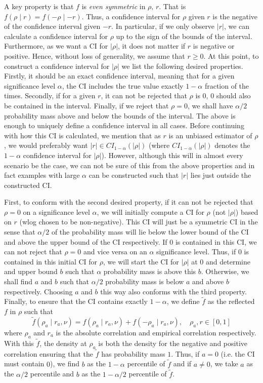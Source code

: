 \documentclass[../Thesis.tex]{subfiles}
\begin{document}
A key property is that $f$ is \textit{even symmetric} in $\rho,\, r$. That is $f(\rho \mid r) = f(-\rho \mid -r)$. Thus, a confidence interval for $\rho$ given $r$ is the negative of the confidence interval given $-r$. In particular, if we only observe $|r|$, we can calculate a confidence interval for $\rho$ up to the sign of the bounds of the interval. Furthermore, as we want a CI for $|\rho|$, it does not matter if $r$ is negative or positive. Hence, without loss of generality, we assume that $r \geq 0$. At this point, to construct a confidence interval for $|\rho|$ we list the following desired properties. Firstly, it should be an exact confidence interval, meaning that for a given significance level $\alpha$, the CI includes the true value exactly $1-\alpha$ fraction of the times. Secondly, if for a given $r$, it can not be rejected that $\rho$ is 0, 0 should also be contained in the interval. Finally, if we reject that $\rho = 0$, we shall have $\alpha/2$ probability mass above and below the bounds of the interval. The above is enough to uniquely define a confidence interval in all cases. Before continuing with how this CI is calculated, we mention that as $r$ is an unbiased estimator of $\rho$, we would preferably want $|r| \in CI_{1-\alpha}\left(|\rho|\right)$ (where $CI_{1-\alpha}\left(|\rho|\right)$ denotes the $1-\alpha$ confidence interval for $|\rho|$). However, although this will in almost every scenario be the case, we can not be sure of this from the above properties and in fact examples with large $\alpha$ can be constructed such that $|r|$ lies just outside the constructed CI.

First, to conform with the second desired property, if it can not be rejected that $\rho = 0$ on a significance level $\alpha$, we will initially compute a CI for $\rho$ (not $|\rho|$) based on $r$ (wlog chosen to be non-negative). This CI will just be a symmetric CI in the sense that $\alpha/2$ of the probability mass will lie below the lower bound of the CI and above the upper bound of the CI respectively. If $0$ is contained in this CI, we can not reject that $\rho=0$ and vice versa on an $\alpha$ significance level. Thus, if $0$ is contained in this initial CI for $\rho$, we will start the CI for $|\rho|$ at $0$ and determine and upper bound $b$ such that $\alpha$ probability mass is above this $b$. Otherwise, we shall find $a$ and $b$ such that $\alpha/2$ probability mass is below $a$ and above $b$ respectively. Choosing $a$ and $b$ this way also conforms with the third property. Finally, to ensure that the CI contains exactly $1-\alpha$, we define $\tilde{f}$ as the reflected $f$ in $\rho$ such that
$$\tilde{f}\left(\rho_a \mid r_a, \nu\right) = f(\rho_a \mid r_a, \nu) + f(-\rho_a \mid r_a, \nu),\quad \rho_a,r \in [0,1]$$
where $\rho_a$ and $r_a$ is the absolute correlation and empirical correlation respectively. With this $\tilde{f}$, the density at $\rho_a$ is both the density for the negative and positive correlation ensuring that the $\tilde{f}$ has probability mass $1$. Thus, if $a=0$ (i.e. the CI must contain $0$), we find $b$ as the $1-\alpha$ percentile of $\tilde{f}$ and if $a\neq 0$, we take $a$ as the $\alpha/2$ percentile and $b$ as the $1-\alpha/2$ percentile of $\tilde{f}$.
\end{document}
